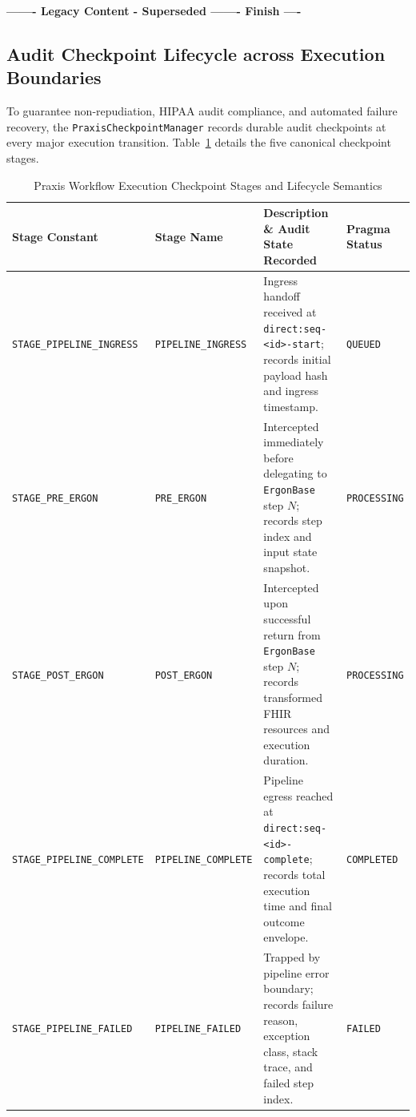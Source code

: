 \par\noindent\textbf{------- Legacy Content - Superseded ------- Finish ----}

\subsection{Audit Checkpoint Lifecycle across Execution Boundaries}
\label{subsec:praxis_checkpoint_lifecycle}

To guarantee non-repudiation, HIPAA audit compliance, and automated failure recovery, the \texttt{PraxisCheckpointManager} records durable audit checkpoints at every major execution transition. Table~\ref{tab:praxis_checkpoint_stages} details the five canonical checkpoint stages.

\begin{table}[htbp]
\centering
\small
\begin{tabularx}{\textwidth}{l p{3.2cm} X l}
\toprule
\textbf{Stage Constant} & \textbf{Stage Name} & \textbf{Description \& Audit State Recorded} & \textbf{Pragma Status} \\
\midrule
\texttt{STAGE\_PIPELINE\_INGRESS} & \texttt{PIPELINE\_INGRESS} & Ingress handoff received at \texttt{direct:seq-<id>-start}; records initial payload hash and ingress timestamp. & \texttt{QUEUED} \\
\texttt{STAGE\_PRE\_ERGON} & \texttt{PRE\_ERGON} & Intercepted immediately before delegating to \texttt{ErgonBase} step $N$; records step index and input state snapshot. & \texttt{PROCESSING} \\
\texttt{STAGE\_POST\_ERGON} & \texttt{POST\_ERGON} & Intercepted upon successful return from \texttt{ErgonBase} step $N$; records transformed FHIR resources and execution duration. & \texttt{PROCESSING} \\
\texttt{STAGE\_PIPELINE\_COMPLETE} & \texttt{PIPELINE\_COMPLETE} & Pipeline egress reached at \texttt{direct:seq-<id>-complete}; records total execution time and final outcome envelope. & \texttt{COMPLETED} \\
\texttt{STAGE\_PIPELINE\_FAILED} & \texttt{PIPELINE\_FAILED} & Trapped by pipeline error boundary; records failure reason, exception class, stack trace, and failed step index. & \texttt{FAILED} \\
\bottomrule
\end{tabularx}
\caption{Praxis Workflow Execution Checkpoint Stages and Lifecycle Semantics}
\label{tab:praxis_checkpoint_stages}
\end{table}

